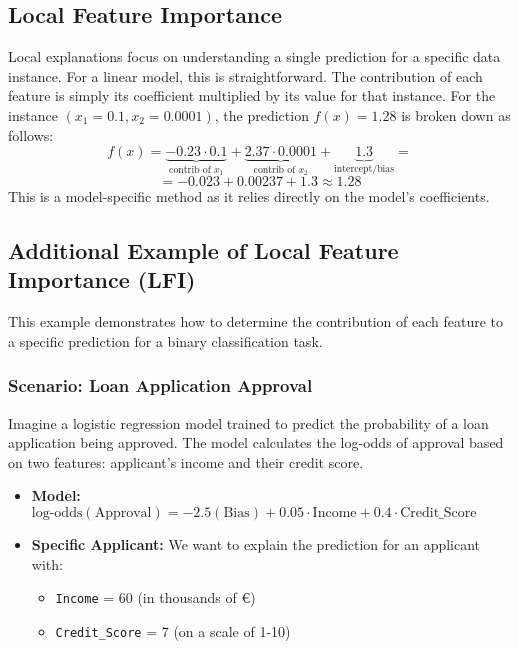 \documentclass{article}
\begin{document}
\begin{multicols}{2}
	\subsection{Local Feature Importance}
	Local explanations focus on understanding a single prediction for a specific data instance. For a linear model, this is straightforward. The contribution of each feature is simply its coefficient multiplied by its value for that instance. For the instance $(x_1=0.1, x_2=0.0001)$, the prediction $f(x)=1.28$ is broken down as follows:
	$$ f(x) = \underbrace{-0.23 \cdot 0.1}_{\text{contrib of } x_1} + \underbrace{2.37 \cdot 0.0001}_{\text{contrib of } x_2} + \underbrace{1.3}_{\text{intercept/bias}} =$$
	$$= -0.023 + 0.00237 + 1.3 \approx 1.28 $$
	This is a model-specific method as it relies directly on the model's coefficients.


	\subsection{Additional Example of Local Feature Importance (LFI)}

	This example demonstrates how to determine the contribution of each feature to a specific prediction for a binary classification task.

	\subsubsection{Scenario: Loan Application Approval}

	Imagine a logistic regression model trained to predict the probability of a loan application being approved. The model calculates the log-odds of approval based on two features: applicant's income and their credit score.

	\begin{itemize}
		\item \textbf{Model:} $\text{log-odds}(\text{Approval}) = -2.5 (\text{Bias}) + 0.05 \cdot \text{Income} + 0.4 \cdot \text{Credit\_Score}$
		\item \textbf{Specific Applicant:} We want to explain the prediction for an applicant with:
		      \begin{itemize}
			      \item \texttt{Income} = 60 (in thousands of €)
			      \item \texttt{Credit\_Score} = 7 (on a scale of 1-10)
		      \end{itemize}
	\end{itemize}


\end{multicols}
\end{document}
